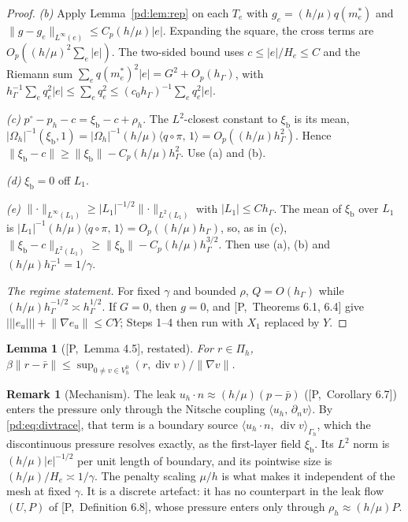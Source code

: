 \documentclass[11pt,reqno]{amsart}
\theoremstyle{plain}
\newtheorem{lemma}[theorem]{Lemma}
\theoremstyle{definition}
\newtheorem{remark}[theorem]{Remark}
\newcommand{\hG}{h_\Gamma}
\newcommand{\Gh}{\Gamma_h}
\newcommand{\Oh}{\Omega_h}
\newcommand{\VO}{V_h^0}
\newcommand{\Pih}{\Pi_h}
\newcommand{\dn}{\partial_n}
\newcommand{\pbar}{\bar p}
\newcommand{\ip}[2]{\langle #1,\, #2\rangle}
\newcommand{\tnorm}[1]{|\!|\!|#1|\!|\!|}
\newcommand{\norm}[1]{\lVert #1\rVert}
\renewcommand{\div}{\operatorname{div}}
\newcommand{\Pref}[1]{\textup{[P,~#1]}}
\newcommand{\Lay}{L_1}
\newcommand{\xib}{\xi_{\mathrm b}}
\begin{document}
\begin{proof}
\emph{(b)} Apply Lemma~\ref{pd:lem:rep} on each $T_e$ with $g_e=(h/\mu)q(m_e^\ast)$ and $\norm{g-g_e}_{L^\infty(e)}\le C_p(h/\mu)|e|$. Expanding the square, the cross terms are $O_p((h/\mu)^2\sum_e|e|)$. The two-sided bound uses $c\le|e|/H_e\le C$ and the Riemann sum $\sum_eq(m_e^\ast)^2|e|=G^2+O_p(\hG)$, with $\hG^{-1}\sum_eq_e^2|e|\le\sum_eq_e^2\le(c_0\hG)^{-1}\sum_eq_e^2|e|$.

\emph{(c)} $p^\circ-p_h-c=\xib-c+\rho_h$. The $L^2$-closest constant to $\xib$ is its mean, $|\Oh|^{-1}(\xib,1)=|\Oh|^{-1}(h/\mu)\ip{q\circ\pi}1=O_p((h/\mu)\hG^2)$. Hence $\norm{\xib-c}\ge\norm\xib-C_p(h/\mu)\hG^2$. Use (a) and (b).

\emph{(d)} $\xib=0$ off $\Lay$.

\emph{(e)} $\norm{\cdot}_{L^\infty(\Lay)}\ge|\Lay|^{-1/2}\norm\cdot_{L^2(\Lay)}$ with $|\Lay|\le C\hG$. The mean of $\xib$ over $\Lay$ is $|\Lay|^{-1}(h/\mu)\ip{q\circ\pi}1=O_p((h/\mu)\hG)$, so, as in (c), $\norm{\xib-c}_{L^2(\Lay)}\ge\norm\xib-C_p(h/\mu)\hG^{3/2}$. Then use (a), (b) and $(h/\mu)\hG^{-1}=1/\gamma$.

\emph{The regime statement.} For fixed $\gamma$ and bounded $\rho$, $Q=O(\hG)$ while $(h/\mu)\hG^{-1/2}\asymp\hG^{1/2}$. If $G=0$, then $g=0$, and \Pref{Theorems 6.1, 6.4} give $\tnorm{e_u}+\norm{\nabla e_u}\le CY$; Steps 1--4 then run with $X_1$ replaced by $Y$.
\end{proof}

\begin{lemma}[\Pref{Lemma 4.5}, restated]\label{pd:lem:infsup_ref}
For $r\in\Pih$, $\beta\norm{r-\bar r}\le\sup_{0\ne v\in\VO}(r,\div v)/\norm{\nabla v}$.
\end{lemma}

\begin{remark}[Mechanism]\label{pd:rem:gsmech}
The leak $u_h\cdot n\approx(h/\mu)(p-\pbar)$ (\Pref{Corollary 6.7}) enters the pressure only through the Nitsche coupling $\ip{u_h}{\dn v}$. By \eqref{pd:eq:divtrace}, that term is a boundary source $\ip{u_h\cdot n}{\div v}_{\Gh}$, which the discontinuous pressure resolves exactly, as the first-layer field $\xib$. Its $L^2$ norm is $(h/\mu)|e|^{-1/2}$ per unit length of boundary, and its pointwise size is $(h/\mu)/H_e\asymp1/\gamma$. The penalty scaling $\mu/h$ is what makes it independent of the mesh at fixed $\gamma$. It is a discrete artefact: it has no counterpart in the leak flow $(U,P)$ of \Pref{Definition 6.8}, whose pressure enters only through $\rho_h\approx(h/\mu)P$.
\end{remark}
\end{document}
